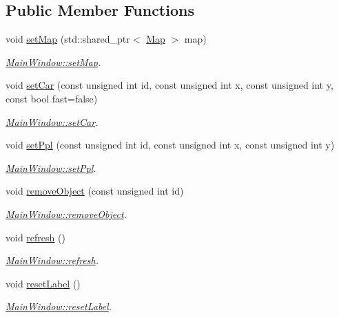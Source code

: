 \subsection*{Public Member Functions}
\begin{DoxyCompactItemize}
\item 
void \hyperlink{classMainWindow_a9907ff1d21c9e2cc7078a2b5ba043b52}{set\-Map} (std\-::shared\-\_\-ptr$<$ \hyperlink{classMap}{Map} $>$ map)
\begin{DoxyCompactList}\small\item\em \hyperlink{classMainWindow_a9907ff1d21c9e2cc7078a2b5ba043b52}{Main\-Window\-::set\-Map}. \end{DoxyCompactList}\item 
void \hyperlink{classMainWindow_a8a2dbcb697f105c012e3ca3704d95b77}{set\-Car} (const unsigned int id, const unsigned int x, const unsigned int y, const bool fast=false)
\begin{DoxyCompactList}\small\item\em \hyperlink{classMainWindow_a8a2dbcb697f105c012e3ca3704d95b77}{Main\-Window\-::set\-Car}. \end{DoxyCompactList}\item 
void \hyperlink{classMainWindow_a41c3fa9c4208016244cfc988ec0967ca}{set\-Ppl} (const unsigned int id, const unsigned int x, const unsigned int y)
\begin{DoxyCompactList}\small\item\em \hyperlink{classMainWindow_a41c3fa9c4208016244cfc988ec0967ca}{Main\-Window\-::set\-Ppl}. \end{DoxyCompactList}\item 
void \hyperlink{classMainWindow_a3ec289e870edc7413a1e03245eee4e1a}{remove\-Object} (const unsigned int id)
\begin{DoxyCompactList}\small\item\em \hyperlink{classMainWindow_a3ec289e870edc7413a1e03245eee4e1a}{Main\-Window\-::remove\-Object}. \end{DoxyCompactList}\item 
void \hyperlink{classMainWindow_ab27297114529e4c16d6d8d7a54927a0e}{refresh} ()
\begin{DoxyCompactList}\small\item\em \hyperlink{classMainWindow_ab27297114529e4c16d6d8d7a54927a0e}{Main\-Window\-::refresh}. \end{DoxyCompactList}\item 
void \hyperlink{classMainWindow_a5912f1655918f9f941280fc900695594}{reset\-Label} ()
\begin{DoxyCompactList}\small\item\em \hyperlink{classMainWindow_a5912f1655918f9f941280fc900695594}{Main\-Window\-::reset\-Label}. \end{DoxyCompactList}\end{DoxyCompactItemize}
